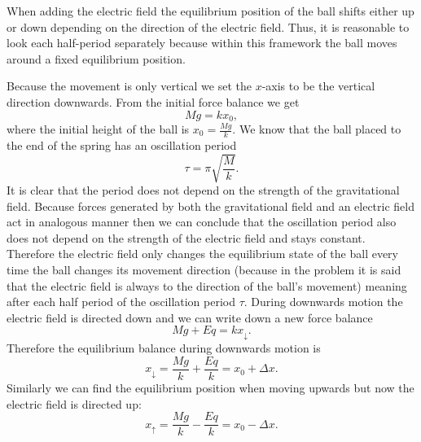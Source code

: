 \hinteng
When adding the electric field the equilibrium position of the ball shifts either up or down depending on the direction of the electric field. Thus, it is reasonable to look each half-period separately because within this framework the ball moves around a fixed equilibrium position.

\solueng
Because the movement is only vertical we set the $x$-axis to be the vertical direction downwards. From the initial force balance we get
$$Mg = kx_0,$$
where the initial height of the ball is $x_0 = \frac{Mg}{k}$. We know that the ball placed to the end of the spring has an oscillation period
$$\tau = \pi \sqrt{\frac{M}{k}}.$$ 
It is clear that the period does not depend on the strength of the gravitational field. Because forces generated by both the gravitational field and an electric field act in analogous manner then we can conclude that the oscillation period also does not depend on the strength of the electric field and stays constant. Therefore the electric field only changes the equilibrium state of the ball every time the ball changes its movement direction (because in the problem it is said that the electric field is always to the direction of the ball’s movement) meaning after each half period of the oscillation period $\tau$. During downwards motion the electric field is directed down and we can write down a new force balance
$$Mg + Eq = kx_\downarrow.$$ 
Therefore the equilibrium balance during downwards motion is 
$$x_\downarrow = \frac{Mg}{k} + \frac{Eq}{k} = x_0 + \Delta x.$$ 
Similarly we can find the equilibrium position when moving upwards but now the electric field is directed up:
$$x_\uparrow = \frac{Mg}{k} - \frac{Eq}{k} = x_0 - \Delta x.$$ 

